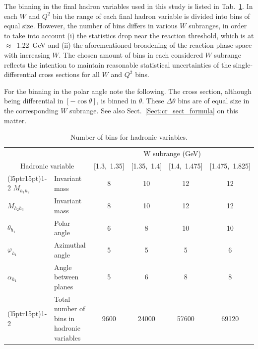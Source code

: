 The binning in the final hadron variables used in this study is listed in Tab.~\ref{tab:summary_bins}. In each $W$ and $Q^{2}$ bin the range of each final hadron variable is divided into bins of equal size. However, the number of bins differs in various $W$ subranges, in order to take into account (i) the statistics drop near the reaction threshold, which is at $\approx$~1.22~GeV and (ii) the aforementioned broadening of the reaction phase-space with increasing $W$. The chosen amount of bins in each considered $W$ subrange reflects the intention to maintain reasonable statistical uncertainties of the single-differential cross sections for all $W$ and $Q^2$ bins. 



For the binning in the polar angle note the following. The cross section, although being differential in $[-\cos\theta]$, is binned in $\theta$. These $\Delta \theta$ bins are of equal size in the corresponding $W$ subrange. See also Sect.~\ref{Sect:cr_sect_formula} on this matter.



\vspace{0.5em}
\begin{table}[htb]
\centering 
  \caption{Number of bins for hadronic variables.} \label{tab:summary_bins}
  \begin{tabular}{lm{4cm}cccc}
    \toprule
    & & \multicolumn{4}{c}{W subrange (GeV)} \\
    \multicolumn{2}{c}{\centering Hadronic variable }  & [1.3,~1.35] & [1.35,~1.4] & [1.4,~1.475] & [1.475,~1.825] \\
    \cmidrule(l{5pt}r{15pt}){1-2} \cmidrule(l{5pt}r{5pt}){3-6}
    $M_{h_{1}h_{2}}$   & Invariant mass       &   8  & 10 & 12 & 12  \\
    $M_{h_{2}h_{3}}$   & Invariant mass       &   8  & 10 & 12 & 12  \\
    $\theta_{h_{1}}$   & Polar angle          &   6  & 8  & 10 & 10  \\
    $\varphi_{h_{1}}$  & Azimuthal angle      &   5  & 5  & 5  & 6   \\
    $\alpha_{h_{1}}$   & Angle between planes &   5  & 6  & 8  & 8   \\
    \cmidrule(l{5pt}r{15pt}){1-2} \cmidrule(l{5pt}r{5pt}){3-6}
              & Total number of bins \newline in hadronic variables &   9600  & 24000  & 57600  & 69120   \\
    \bottomrule
  \end{tabular}
\end{table}
\vspace{0.5em}

